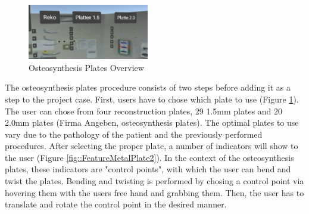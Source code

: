 \begin{figure}[ht]
    \centering
    \includegraphics[width=200px]{images/implementation/features/procedures/metal_plates_1.png}
    \caption{\label{fig::FeatureMetalPlate} Osteosynthesis Plates Overview}
\end{figure}

The osteosynthesis plates procedure consists of two steps before adding it as a step to the project case.
First, users have to chose which plate to use (Figure \ref{fig::FeatureMetalPlate}).
The user can chose from four reconstruction plates, 29 1.5mm plates and 20 2.0mm plates (Firma Angeben, osteosynthesis plates).
The optimal plates to use vary due to the pathology of the patient and the previously performed procedures.
After selecting the proper plate, a number of indicators will show to the user (Figure \ref{fig::FeatureMetalPlate2}).
In the context of the osteosynthesis plates, these indicators are "control points", with which the user can bend and twist the plates.
Bending and twisting is performed by chosing a control point via hovering them with the users free hand and grabbing them.
Then, the user has to translate and rotate the control point in the desired manner.
